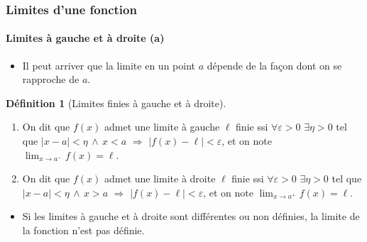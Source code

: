 \documentclass[10pt,notheorems]{beamer}
\theoremstyle{plain}
\theoremstyle{definition} %
\newtheorem{definition}{Définition}
\begin{document}
\begin{frame}
  \frametitle{Limites d'une fonction}
  \framesubtitle{Limites à gauche et à droite (a)}

  \begin{itemize}

  \item Il peut arriver que la limite en un point $a$ dépende de la façon dont on se rapproche de $a$.\newline
  \end{itemize}

  \begin{definition}[Limites finies à gauche et à droite]

    \begin{enumerate}

    \item On dit que $f(x)$ admet une limite à gauche $\ell$ finie ssi $\forall \varepsilon>0$ $\exists\eta>0$ tel que $|x-a|<\eta\,\land\, x<a$ $\Rightarrow$ $|f(x)-\ell|<\varepsilon$, et on note $\lim_{x\rightarrow a^-}f(x) = \ell$.\newline

    \item On dit que $f(x)$ admet une limite à droite $\ell$ finie ssi $\forall \varepsilon>0$ $\exists\eta>0$ tel que $|x-a|<\eta\,\land\, x>a$ $\Rightarrow$ $|f(x)-\ell|<\varepsilon$, et on note $\lim_{x\rightarrow a^+}f(x) = \ell$.

    \end{enumerate}

  \end{definition}

  \bigskip

  \begin{itemize}

  \item Si les limites à gauche et à droite sont différentes ou non définies, la limite de la fonction n'est pas définie.

  \end{itemize}

\end{frame}
\end{document}
